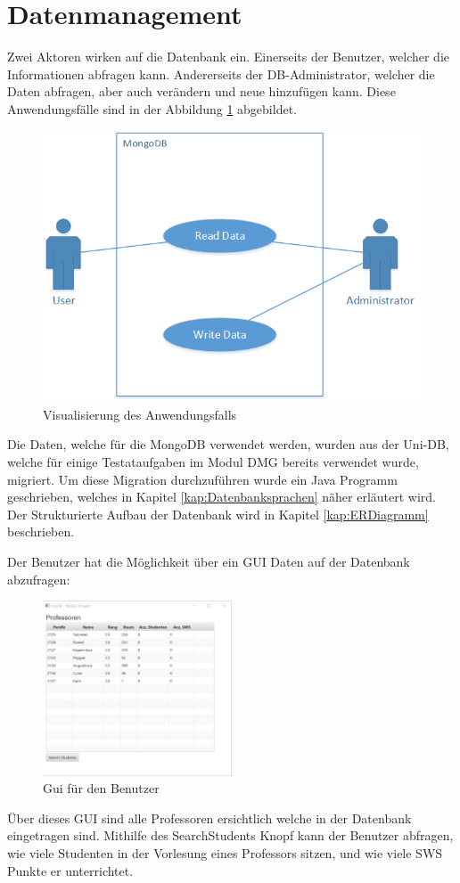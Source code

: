 \section{Datenmanagement}
Zwei Aktoren wirken auf die Datenbank ein. Einerseits der Benutzer, welcher die
Informationen abfragen kann. Andererseits der DB-Administrator, welcher die
Daten abfragen, aber auch verändern und neue hinzufügen kann. Diese
Anwendungsfälle sind in der Abbildung \ref{fig:usecase} abgebildet.

\begin{figure}[h]
  \centering
     \includegraphics[width=1\textwidth]{./pictures/UseCase.png}
  \caption{Visualisierung des Anwendungsfalls}
  \label{fig:usecase}
\end{figure}

Die Daten, welche für die MongoDB verwendet werden, wurden aus der Uni-DB, welche für einige Testataufgaben im Modul DMG bereits verwendet wurde, migriert. Um diese Migration durchzuführen wurde ein Java Programm geschrieben, welches in Kapitel \ref{kap:Datenbanksprachen} näher erläutert wird. Der Strukturierte Aufbau der Datenbank wird in Kapitel \ref{kap:ERDiagramm} beschrieben.

\newpage
\noindent
Der Benutzer hat die Möglichkeit über ein GUI Daten auf der Datenbank abzufragen:
\begin{figure}[h]
	\centering
	\includegraphics[width=0.5\textwidth]{./pictures/UniDBView.png}
	\caption{Gui für den Benutzer}
	\label{fig:GUI1}
\end{figure}

Über dieses GUI sind alle Professoren ersichtlich welche in der Datenbank eingetragen sind.
Mithilfe des SearchStudents Knopf kann der Benutzer abfragen, wie viele Studenten in der Vorlesung eines Professors sitzen, und wie viele SWS Punkte er unterrichtet.